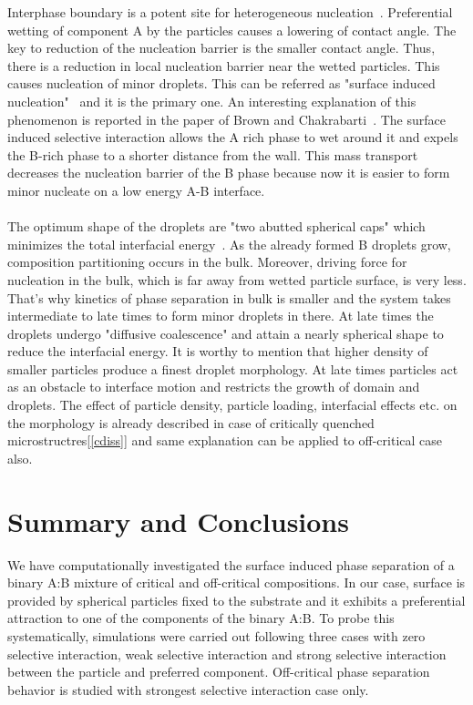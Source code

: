 \documentclass[12pt]{iiscthes}
\theoremstyle{definition}
\theoremstyle{definition}
\theoremstyle{remark}
\begin{document}
Interphase boundary is a potent site for heterogeneous nucleation~\cite{Porter}. Preferential wetting of component A by the particles causes a lowering of contact angle. The key to reduction of the nucleation barrier is the smaller contact angle. Thus, there is a reduction in local nucleation barrier near the wetted particles. This causes nucleation of minor droplets. This can be referred as "surface induced nucleation"~\cite{Puri_Frisch} and it is the primary one. An interesting explanation of this phenomenon is reported in the paper of Brown and Chakrabarti~\cite{Brown}. The surface induced selective interaction allows the A rich phase to wet around it and expels the B-rich phase to a shorter distance from the wall. This mass transport decreases the nucleation barrier of the B phase because now it is easier to form minor nucleate on a low energy A-B interface.
\\ \\
The optimum shape of the droplets are "two abutted spherical caps" which minimizes the total interfacial energy~\cite{Porter}. As the already formed B droplets grow, composition partitioning occurs in the bulk. Moreover, driving force for nucleation in the bulk, which is far away from wetted particle surface, is very less. That's why kinetics of phase separation in bulk is smaller and the system takes intermediate to late times to form minor droplets in there. At late times the droplets undergo "diffusive coalescence" and attain a nearly spherical shape to reduce the interfacial energy. It is worthy to mention that higher density of smaller particles produce a finest droplet morphology. At late times particles act as an obstacle to interface motion and restricts the growth of domain and droplets. The effect of particle density, particle loading, interfacial effects etc. on the morphology is already described in case of critically quenched microstructres[\ref{cdiss}] and same explanation can be applied to off-critical case also. 

\chapter{Summary and Conclusions}
We have computationally investigated the surface induced phase separation of a binary A:B mixture of critical and off-critical compositions. In our case, surface is provided by spherical particles fixed to the substrate and it exhibits a preferential attraction to one of the components of the binary A:B. To probe this systematically, simulations were carried out following three cases with zero selective interaction, weak selective interaction and strong selective interaction between the particle and preferred component. Off-critical phase separation behavior is studied with strongest selective interaction case only. 
\end{document}
